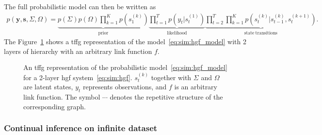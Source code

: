 The full probabilistic model can then be written as \begin{equation}
  \begin{aligned}
    \label{eq:sim:hgf_model} p(\bm{y}, \bm{s}, \Sigma, \Omega) =
    \underbrace{p(\Sigma)p(\Omega)\prod_{k = 1}^{K}p(s_1^{(k)})}_{\mathrm{prior}}\underbrace{\prod_{t = 1}^{T}p(y_t
      \vert s^{(1)}_t)}_{\mathrm{likelihood}} \underbrace{\prod_{t = 2}^{T}\prod_{k = 1}^{K}p(s^{(k)}_t \vert
      s^{(k)}_{t - 1}, s^{(k + 1)}_t)}_{\mathrm{state~transitions}}.
  \end{aligned}
\end{equation} The
Figure~\ref{fig:sim:hgf_model_graph} shows a \ac{tffg} representation of the
model~\eqref{eq:sim:hgf_model} with 2 layers of hierarchy with an arbitrary link function $f$.

\begin{figure}
  \centering
  \resizebox{\textwidth}{!}{}
  \caption{An \ac{tffg} representation of the probabilistic model~\eqref{eq:sim:hgf_model} for a 2-layer \ac{hgf} system~\eqref{eq:sim:hgf}.
    $s^{(k)}_t$ together with $\Sigma$ and $\Omega$ are latent states, $y_t$ represents observations, and $f$ is an arbitrary link function.
    The symbol $\cdots$ denotes the repetitive structure of the corresponding graph.
  }
  \label{fig:sim:hgf_model_graph}
\end{figure}

\subsubsection*{Continual inference on infinite dataset}


